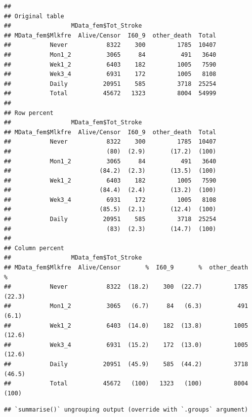 \documentclass[
]{article}
\newenvironment{Shaded}{\begin{snugshade}}{\end{snugshade}}
\newcommand{\DataTypeTok}[1]{\textcolor[rgb]{0.13,0.29,0.53}{#1}}
\newcommand{\KeywordTok}[1]{\textcolor[rgb]{0.13,0.29,0.53}{\textbf{#1}}}
\newcommand{\NormalTok}[1]{#1}
\newcommand{\OperatorTok}[1]{\textcolor[rgb]{0.81,0.36,0.00}{\textbf{#1}}}
\newcommand{\StringTok}[1]{\textcolor[rgb]{0.31,0.60,0.02}{#1}}
\begin{document}
\begin{verbatim}
## 
## Original table 
##                 MData_fem$Tot_Stroke
## MData_fem$Mlkfre  Alive/Censor  I60_9  other_death  Total
##           Never           8322    300         1785  10407
##           Mon1_2          3065     84          491   3640
##           Wek1_2          6403    182         1005   7590
##           Wek3_4          6931    172         1005   8108
##           Daily          20951    585         3718  25254
##           Total          45672   1323         8004  54999
## 
## Row percent 
##                 MData_fem$Tot_Stroke
## MData_fem$Mlkfre  Alive/Censor  I60_9  other_death  Total
##           Never           8322    300         1785  10407
##                           (80)  (2.9)       (17.2)  (100)
##           Mon1_2          3065     84          491   3640
##                         (84.2)  (2.3)       (13.5)  (100)
##           Wek1_2          6403    182         1005   7590
##                         (84.4)  (2.4)       (13.2)  (100)
##           Wek3_4          6931    172         1005   8108
##                         (85.5)  (2.1)       (12.4)  (100)
##           Daily          20951    585         3718  25254
##                           (83)  (2.3)       (14.7)  (100)
## 
## Column percent 
##                 MData_fem$Tot_Stroke
## MData_fem$Mlkfre  Alive/Censor       %  I60_9       %  other_death       %
##           Never           8322  (18.2)    300  (22.7)         1785  (22.3)
##           Mon1_2          3065   (6.7)     84   (6.3)          491   (6.1)
##           Wek1_2          6403  (14.0)    182  (13.8)         1005  (12.6)
##           Wek3_4          6931  (15.2)    172  (13.0)         1005  (12.6)
##           Daily          20951  (45.9)    585  (44.2)         3718  (46.5)
##           Total          45672   (100)   1323   (100)         8004   (100)
\end{verbatim}

\begin{Shaded}
\end{Shaded}

\begin{verbatim}
## `summarise()` ungrouping output (override with `.groups` argument)
\end{verbatim}
\end{document}
